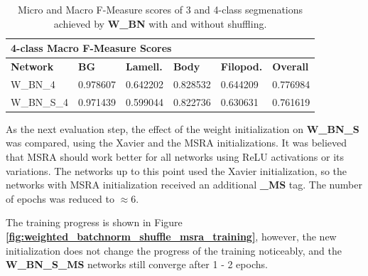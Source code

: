\begin {table}
\begin{flushleft}
\begin {tabular}[!htb]{|l|l|l|l|l|l|}
			\multicolumn{6}{|l|}{\textbf{4-class Macro F-Measure Scores}} \\ \hline
			\textbf{Network}& \textbf{BG}& \textbf{Lamell.}& \textbf{Body}& \textbf{Filopod.}& \textbf{Overall} \\ \hline
			W\_BN\_4& \cellcolor{green!25}0.978607& \cellcolor{green!25}0.642202& \cellcolor{green!25}0.828532& \cellcolor{green!25}0.644209& \cellcolor{green!25}0.776984 \\ \hline
			W\_BN\_S\_4& 0.971439& 0.599044& 0.822736& 0.630631& 0.761619 \\ \hline
		\end {tabular}
	\end {flushleft}

\caption[Micro and Macro F-Measure scores for a network with Batch Normalization and with or without shuffling.]{Micro and Macro F-Measure scores of 3 and 4-class segmenations achieved by \textbf{W\_BN} with and without shuffling.}
\label{tab:results3}
\end {table}


\noindent As the next evaluation step, the effect of the weight initialization on \textbf{W\_BN\_S} was compared, using the Xavier and the MSRA initializations. It was believed that MSRA should work better for all networks using ReLU activations or its variations. The networks up to this point used the Xavier initialization, so the networks with MSRA initialization received an additional \textbf{\_MS} tag. The number of epochs was reduced to $\approx$6.

The training progress is shown in Figure \textbf{\ref{fig:weighted_batchnorm_shuffle_msra_training}}, however, the new initialization does not change the progress of the training noticeably, and the \textbf{W\_BN\_S\_MS} networks still converge after 1 - 2 epochs.\\


